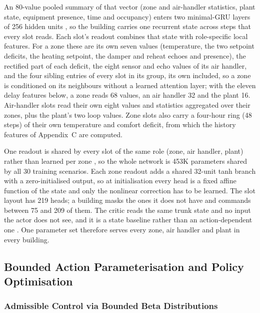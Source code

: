 \documentclass{article}
\begin{document}
An 80-value pooled summary of that vector (zone and air-handler statistics, plant state, equipment presence, time and occupancy) enters two minimal-GRU layers of 256 hidden units \citep{feng2024rnn}, so the building carries one recurrent state across steps that every slot reads. Each slot's readout combines that state with role-specific local features. For a zone these are its own seven values (temperature, the two setpoint deficits, the heating setpoint, the damper and reheat echoes and presence), the rectified part of each deficit, the eight sensor and echo values of its air handler, and the four sibling entries of every slot in its group, its own included, so a zone is conditioned on its neighbours without a learned attention layer; with the eleven delay features below, a zone reads 68 values, an air handler 32 and the plant 16. Air-handler slots read their own eight values and statistics aggregated over their zones, plus the plant's two loop values. Zone slots also carry a four-hour ring (48 steps) of their own temperature and comfort deficit, from which the history features of Appendix~C are computed.

One readout is shared by every slot of the same role (zone, air handler, plant) rather than learned per zone \citep{zaheer2017deepsets}, so the whole network is 453K parameters shared by all 30 training scenarios. Each zone readout adds a shared 32-unit tanh branch with a zero-initialised output, so at initialisation every head is a fixed affine function of the state and only the nonlinear correction has to be learned. The slot layout has 219 heads; a building masks the ones it does not have and commands between 75 and 209 of them. The critic reads the same trunk state and no input the actor does not see, and it is a state baseline rather than an action-dependent one \citep{tucker2018mirage}. One parameter set therefore serves every zone, air handler and plant in every building.

\subsection{Bounded Action Parameterisation and Policy Optimisation}

\subsubsection{Admissible Control via Bounded Beta Distributions}
\end{document}
